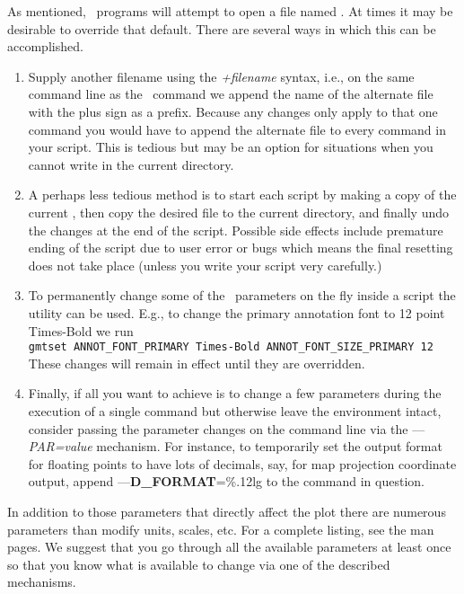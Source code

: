 As mentioned, \GMT\ programs will attempt to open a file named
.  At times it may be desirable to override
that default.  There are several ways in which this can be accomplished.
\begin{enumerate}
\item Supply another filename using the \emph{+filename} syntax, i.e.,
on the same command line as the \GMT\ command we append the name of
the alternate  file with the plus sign as a prefix.
Because any changes only apply to that one command you would have to
append the alternate file to every command in your script.  This is
tedious but may be an option for situations when you cannot write in
the current directory.
\item A perhaps less tedious method is to start each script by making a
copy of the current , then copy the desired
 file to the current directory, and finally
undo the changes at the end of the script.  Possible side effects
include premature ending of the script due to user error or bugs which
means the final resetting does not take place (unless you write your
script very carefully.)
\item To permanently change some of the \GMT\ parameters on the fly
inside a script the  utility can be used.  E.g., to
change the primary annotation font to 12 point Times-Bold we run \\

\texttt{gmtset ANNOT\_FONT\_PRIMARY Times-Bold ANNOT\_FONT\_SIZE\_PRIMARY 12} \\

These changes will remain in effect until they are overridden.
\item Finally, if all you want to achieve is to change a few parameters during
the execution of a single command but otherwise leave the environment intact, consider
passing the parameter changes on the command line via the {--}{--}\emph{PAR=value}
mechanism.  For instance, to temporarily set the output format for floating
points to have lots of decimals, say, for map projection coordinate output,
append {--}{--}\textbf{D\_FORMAT}=\%.12lg to the command in question.
\end{enumerate}
In addition to those parameters
that directly affect the plot there are numerous parameters than
modify units, scales, etc.  For a complete listing, see the
 man pages.  We suggest that you go through
all the available parameters at least once so that you know what is
available to change via one of the described mechanisms.

